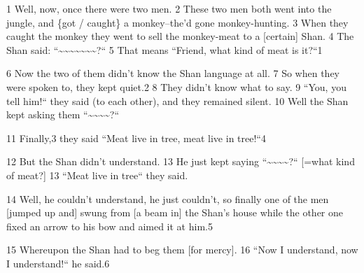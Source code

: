 
1 Well, now, once there were two men. 2 These two men both went into the jungle,
and \{got / caught\} a monkey--the'd gone monkey-hunting. 3 When they caught the
monkey they went to sell the monkey-meat to a [certain] Shan. 4 The Shan said:
``\textasciitilde{}\textasciitilde{}\textasciitilde{}\textasciitilde{}\textasciitilde{}\textasciitilde{}\textasciitilde{}?``
5 That means ``Friend, what kind of meat is it?``1

6 Now the two of them didn't know the Shan language at all. 7 So when they were
spoken to, they kept quiet.2 8 They didn't know what to say. 9 ``You, you
tell him!`` they said (to each other), and they remained silent. 10 Well
the Shan kept asking them ``\textasciitilde{}\textasciitilde{}\textasciitilde{}\textasciitilde{}?``

11 Finally,3 they said ``Meat live in tree, meat live in tree!``4

12 But the Shan didn't understand. 13 He just kept saying ``\textasciitilde{}\textasciitilde{}\textasciitilde{}\textasciitilde{}?``
[=what kind of meat?] 13 ``Meat live in tree`` they said.

14 Well, he couldn't understand, he just couldn't, so finally one of the men [jumped
up and] swung from [a beam in] the Shan's house while the other one fixed an arrow
to his bow and aimed it at him.5

15 Whereupon the Shan had to beg them [for mercy]. 16 ``Now I understand,
now I understand!`` he said.6

